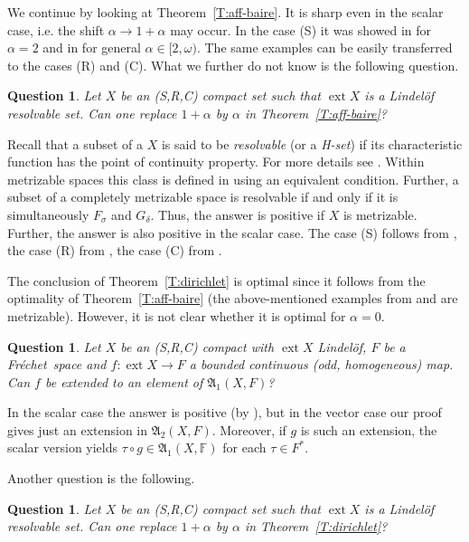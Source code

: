 \documentclass{amsart}
\numberwithin{equation}{section}
\newtheorem{question}[thm]{Question}
\theoremstyle{definition}
\def\fra{\mathfrak{A}}
\def\ef{\mathbb F}
\def \ext {\operatorname{ext}}
\newcommand{\fr}{Fr\'echet\ }
\begin{document}
We continue by looking at Theorem~\ref{T:aff-baire}.  It is sharp even in the scalar case, i.e. the shift $\alpha\to1+\alpha$ may occur. In the case (S) it was showed in \cite{spurnytams} for $\alpha=2$ and in \cite{spu-zel} for general $\alpha\in[2,\omega)$. The same examples can be easily transferred to the cases (R) and (C). What we further do not know is the following question.

\begin{question} Let $X$ be an (S,R,C) compact set such that $\ext X$ is a Lindel\"of resolvable set. Can one replace $1+\alpha$ by $\alpha$ in Theorem~\ref{T:aff-baire}?
\end{question}

Recall that a subset of a $X$ is said to be \emph{resolvable} (or a \emph{H-set}) if its characteristic function has the point of continuity property. For more details see \cite{spu-ka}. Within metrizable spaces this class is defined in \cite[\S12, III]{kuratowski} using an equivalent condition. Further, a subset of a completely metrizable space is resolvable if and only if it is simultaneously $F_\sigma$ and $G_\delta$. Thus, the answer is positive if $X$ is metrizable.
Further, the answer is also positive in the scalar case. The case (S) follows from \cite{spu-ka}, the case (R) from \cite[Theorem 1.4]{lusp}, the case (C) from \cite[Theorem 2.23]{lusp-complex}.

The conclusion of Theorem~\ref{T:dirichlet} is optimal since it follows from the optimality of Theorem~\ref{T:aff-baire} (the above-mentioned examples from \cite{spurnytams} and  \cite{spu-zel} are metrizable). However, it is not clear whether it is optimal for $\alpha=0$. 

\begin{question} Let $X$ be an (S,R,C) compact with $\ext X$ Lindel\"of, $F$ be a \fr space and $f\colon\ext X\to F$ a bounded continuous (odd, homogeneous) map. Can $f$ be extended to an element of $\fra_1(X,F)$?
\end{question}

In the scalar case the answer is positive (by \cite{Jel,lusp23,lusp-complex}), but in the vector case our proof gives just an extension in $\fra_2(X,F)$. Moreover, if $g$ is such an extension, the scalar version yields $\tau\circ g\in\fra_1(X,\ef)$ for each $\tau\in F^*$.

Another question is the following.

\begin{question} Let $X$ be an (S,R,C) compact set such that $\ext X$ is a Lindel\"of resolvable set. Can one replace $1+\alpha$ by $\alpha$ in Theorem~\ref{T:dirichlet}?
\end{question}
\end{document}
